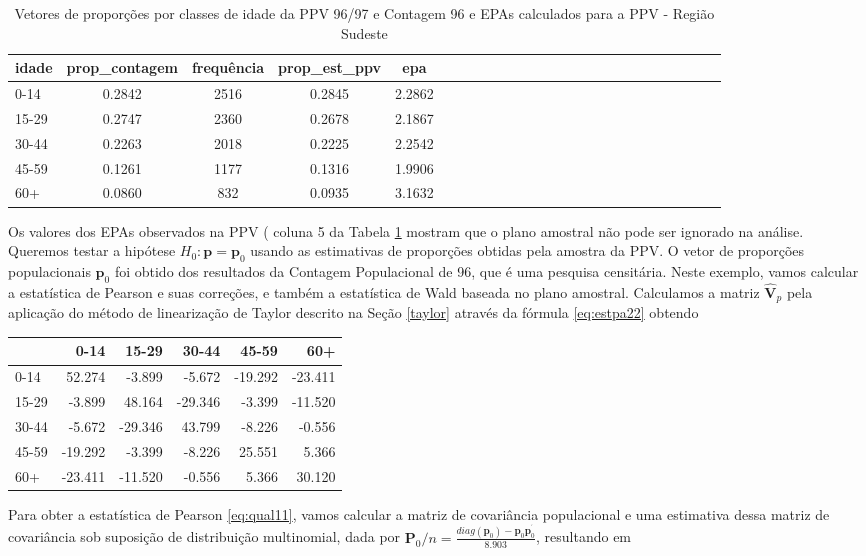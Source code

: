 \documentclass[]{book}
\theoremstyle{definition}
\theoremstyle{definition}
\theoremstyle{definition}
\theoremstyle{remark}
\begin{document}
\begin{table}

\caption{\label{tab:ppcount}Vetores de proporções por classes de idade da PPV 96/97 e Contagem
 96 e EPAs calculados para a PPV - Região Sudeste}
\centering
\begin{tabular}[t]{lcccclcccclcccclcccclcccc}
\toprule
idade & prop\_contagem & frequência & prop\_est\_ppv & epa\\
\midrule
0-14 & 0.2842 & 2516 & 0.2845 & 2.2862\\
15-29 & 0.2747 & 2360 & 0.2678 & 2.1867\\
30-44 & 0.2263 & 2018 & 0.2225 & 2.2542\\
45-59 & 0.1261 & 1177 & 0.1316 & 1.9906\\
60+ & 0.0860 & 832 & 0.0935 & 3.1632\\
\bottomrule
\end{tabular}
\end{table}

Os valores dos EPAs observados na PPV ( coluna 5 da Tabela
\ref{tab:ppcount} mostram que o plano amostral não pode ser ignorado na
análise. Queremos testar a hipótese \(H_{0}:\mathbf{p=p}_{0}\) usando as
estimativas de proporções obtidas pela amostra da PPV. O vetor de
proporções populacionais \(\mathbf{p}_{0}\) foi obtido dos resultados da
Contagem Populacional de 96, que é uma pesquisa censitária. Neste
exemplo, vamos calcular a estatística de Pearson e suas correções, e
também a estatística de Wald baseada no plano amostral. Calculamos a
matriz \(\widehat{\mathbf{V}}_{p}\) pela aplicação do método de
linearização de Taylor descrito na Seção \ref{taylor} através da fórmula
\eqref{eq:estpa22} obtendo

\begin{tabular}{l|r|r|r|r|r}
\hline
  & 0-14 & 15-29 & 30-44 & 45-59 & 60+\\
\hline
0-14 & 52.274 & -3.899 & -5.672 & -19.292 & -23.411\\
\hline
15-29 & -3.899 & 48.164 & -29.346 & -3.399 & -11.520\\
\hline
30-44 & -5.672 & -29.346 & 43.799 & -8.226 & -0.556\\
\hline
45-59 & -19.292 & -3.399 & -8.226 & 25.551 & 5.366\\
\hline
60+ & -23.411 & -11.520 & -0.556 & 5.366 & 30.120\\
\hline
\end{tabular}

Para obter a estatística de Pearson \eqref{eq:qual11}, vamos calcular a
matriz de covariância populacional e uma estimativa dessa matriz de
covariância sob suposição de distribuição multinomial, dada por
\(\mathbf{P}_{0}/n=\frac{diag\left( \mathbf{p}_{0}\right) -\mathbf{p}_{0}\mathbf{p}_{0}^{^{\prime }}}{8.903}\),
resultando em
\end{document}
